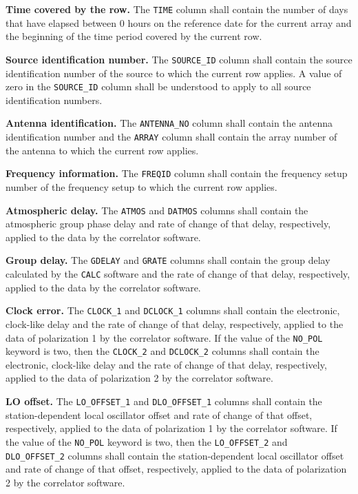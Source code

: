 \documentclass[twoside]{article}
\newcommand{\Me}[1]{\textcolor{mecol}{#1}}
\begin{document}
{\bf Time covered by the row.}  The {\tt TIME} column shall contain
the number of days that have elapsed between 0 hours on the reference
date for the current array and the \Me{beginning} of the time period
covered by the current row.

{\bf Source identification number.}  The {\tt SOURCE\_ID} column shall
contain the source identification number of the source to which the
current row applies.  A value of zero in the {\tt SOURCE\_ID} column
shall be understood to apply to all source identification numbers.

{\bf Antenna identification.}  The {\tt ANTENNA\_NO} column shall
contain the antenna identification number and the {\tt ARRAY} column
shall contain the array number of the antenna to which the current row
applies.

{\bf Frequency information.}  The {\tt FREQID} column shall contain
the frequency setup number of the frequency setup to which the current
row applies.

{\bf Atmospheric delay.}  The {\tt ATMOS} and {\tt DATMOS} columns
shall contain the atmospheric group phase delay and rate of change of
that delay, respectively, applied to the data by the correlator
software.

{\bf Group delay.} The {\tt GDELAY} and {\tt GRATE} columns shall
contain the group delay calculated by the {\tt CALC} software and the
rate of change of that delay, respectively, applied to the data by the
correlator software.

{\bf Clock error.} The {\tt CLOCK\_1} and {\tt DCLOCK\_1} columns
shall contain the electronic, clock-like delay and the rate of change
of that delay, respectively, applied to the data of polarization 1 by
the correlator software.  If the value of the {\tt NO\_POL} keyword is
two, then the {\tt CLOCK\_2} and {\tt DCLOCK\_2} columns shall contain
the electronic, clock-like delay and the rate of change of that delay,
respectively, applied to the data of polarization 2 by the correlator
software.

{\bf LO offset.}  The {\tt LO\_OFFSET\_1} and  {\tt DLO\_OFFSET\_1}
columns shall contain the station-dependent local oscillator offset
and rate of change of that offset, respectively, applied to the data
of polarization 1 by the correlator software.  If the value of the
{\tt NO\_POL} keyword is two, then the {\tt LO\_OFFSET\_2} and  {\tt
  DLO\_OFFSET\_2} columns shall contain the station-dependent local
oscillator offset and rate of change of that offset, respectively,
applied to the data of polarization 2 by the correlator software.
\end{document}
